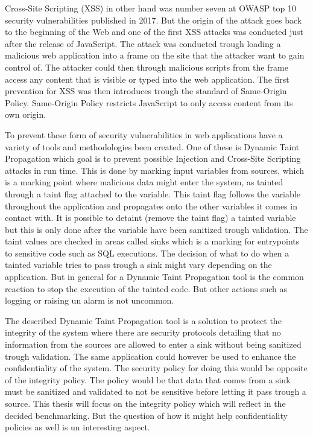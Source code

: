 \documentclass{../kththesis}
\begin{document}
Cross-Site Scripting (XSS) in other hand was number seven at OWASP top 10 security vulnerabilities published in 2017. \parencite{OWASP2017} But the origin of the attack goes back to the beginning of the Web and one of the first XSS attacks was conducted just after the release of JavaScript. The attack was conducted trough loading a malicious web application into a frame on the site that the attacker want to gain control of. The attacker could then through malicious scripts from the frame access any content that is visible or typed into the web application. The first prevention for XSS was then introduces trough the standard of Same-Origin Policy. Same-Origin Policy restricts JavaScript to only access content from its own origin. \parencite{FogieSeth2007Xacs, w3csop} 

To prevent these form of security vulnerabilities in web applications have a variety of tools and methodologies been created. One of these is Dynamic Taint Propagation which goal is to prevent possible Injection and Cross-Site Scripting attacks in run time. This is done by marking input variables from sources, which is a marking point where malicious data might enter the system, as tainted through a taint flag attached to the variable. This taint flag follows the variable throughout the application and propagates onto the other variables it comes in contact with. It is possible to detaint (remove the taint flag) a tainted variable but this is only done after the variable have been sanitized trough validation. The taint values are checked in areas called sinks which is a marking for entrypoints to sensitive code such as SQL executions. \parencite{Pan2015, Venkataramani2008} The decision of what to do when a tainted variable tries to pass trough a sink might vary depending on the application. But in general for a Dynamic Taint Propagation tool is the common reaction to stop the execution of the tainted code. But other actions such as logging or raising un alarm is not uncommon. 

The described Dynamic Taint Propagation tool is a solution to protect the integrity of the system where there are security protocols detailing that no information from the sources are allowed to enter a sink without being sanitized trough validation. The same application could however be used to enhance the confidentiality of the system. The security policy for doing this would be opposite of the integrity policy. The policy would be that data that comes from a sink must be sanitized and validated to not be sensitive before letting it pass trough a source. This thesis will focus on the integrity policy which will reflect in the decided benchmarking. But the question of how it might help confidentiality policies as well is un interesting aspect.
\end{document}
